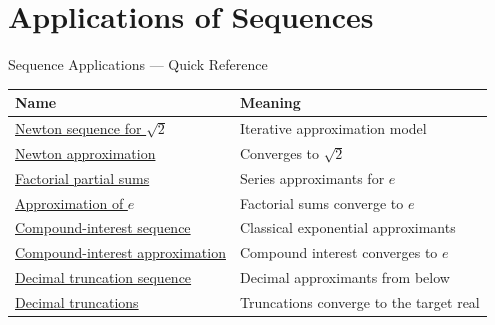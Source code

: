 \section{Applications of Sequences}

\begin{toolkitbox}{Sequence Applications --- Quick Reference}
\small
\begin{tabular}{l l}
\toprule
\textbf{Name} & \textbf{Meaning} \\
\midrule
\hyperref[def:newton-sequence-sqrt-two]{Newton sequence for \(\sqrt2\)} & Iterative approximation model \\
\hyperref[thm:newton-approximation-sqrt-two]{Newton approximation} & Converges to \(\sqrt2\) \\
\hyperref[def:factorial-partial-sums]{Factorial partial sums} & Series approximants for \(e\) \\
\hyperref[thm:factorial-partial-sums-approximate-e]{Approximation of \(e\)} & Factorial sums converge to \(e\) \\
\hyperref[def:compound-interest-sequence]{Compound-interest sequence} & Classical exponential approximants \\
\hyperref[thm:compound-interest-approximation-e]{Compound-interest approximation} & Compound interest converges to \(e\) \\
\hyperref[def:decimal-truncation-sequence]{Decimal truncation sequence} & Decimal approximants from below \\
\hyperref[thm:decimal-truncations-converge]{Decimal truncations} & Truncations converge to the target real \\
\bottomrule
\end{tabular}
\end{toolkitbox}


